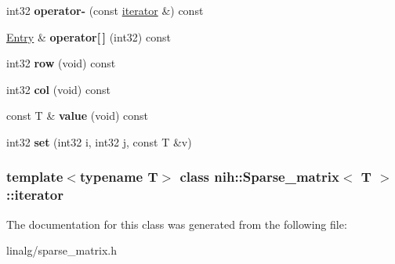 \begin{DoxyCompactItemize}
\item 
\hypertarget{classnih_1_1_sparse__matrix_1_1iterator_a0dcd3f6306353cfdf72c4e2394d2ce9b}{
int32 {\bfseries operator-\/} (const \hyperlink{classnih_1_1_sparse__matrix_1_1iterator}{iterator} \&) const }
\label{classnih_1_1_sparse__matrix_1_1iterator_a0dcd3f6306353cfdf72c4e2394d2ce9b}

\item 
\hypertarget{classnih_1_1_sparse__matrix_1_1iterator_a5da3aa1c432665b048e1c7ec8e12fc22}{
\hyperlink{structnih_1_1_sparse__matrix__entry}{\-Entry} \& {\bfseries operator\mbox{[}$\,$\mbox{]}} (int32) const }
\label{classnih_1_1_sparse__matrix_1_1iterator_a5da3aa1c432665b048e1c7ec8e12fc22}

\item 
\hypertarget{classnih_1_1_sparse__matrix_1_1iterator_a4b11d7b9e726f80d1f4fb1db4a4de9bb}{
int32 {\bfseries row} (void) const }
\label{classnih_1_1_sparse__matrix_1_1iterator_a4b11d7b9e726f80d1f4fb1db4a4de9bb}

\item 
\hypertarget{classnih_1_1_sparse__matrix_1_1iterator_a27db50037e52134c1b1d02cfb80afa39}{
int32 {\bfseries col} (void) const }
\label{classnih_1_1_sparse__matrix_1_1iterator_a27db50037e52134c1b1d02cfb80afa39}

\item 
\hypertarget{classnih_1_1_sparse__matrix_1_1iterator_a302cc332c016d6152b655c1fd101b44e}{
const \-T \& {\bfseries value} (void) const }
\label{classnih_1_1_sparse__matrix_1_1iterator_a302cc332c016d6152b655c1fd101b44e}

\item 
\hypertarget{classnih_1_1_sparse__matrix_1_1iterator_aff9573647f36d4576dafd84297d5278e}{
int32 {\bfseries set} (int32 i, int32 j, const \-T \&v)}
\label{classnih_1_1_sparse__matrix_1_1iterator_aff9573647f36d4576dafd84297d5278e}

\end{DoxyCompactItemize}
\subsubsection*{template$<$typename \-T$>$ class nih\-::\-Sparse\-\_\-matrix$<$ T $>$\-::iterator}



\-The documentation for this class was generated from the following file\-:\begin{DoxyCompactItemize}
\item 
linalg/sparse\-\_\-matrix.\-h\end{DoxyCompactItemize}
